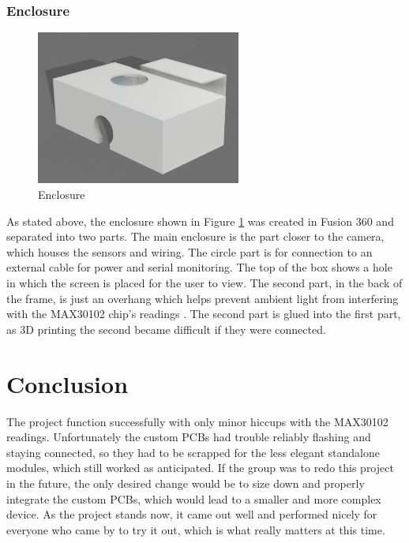 \documentclass[12pt]{article}
\begin{document}
\subsubsection{Enclosure}
    \begin{figure}[hbt!]
        \centering
        \includegraphics[width=0.6\textwidth]{images/enclosure_pic.png}
        \caption{Enclosure}
        \label{enc_ref}
    \end{figure}
    
    As stated above, the enclosure shown in Figure \ref{enc_ref} was created in Fusion 360 and separated into two parts. The main enclosure is the part closer to the camera, which houses the sensors and wiring. The circle part is for connection to an external cable for power and serial monitoring. The top of the box shows a hole in which the screen is placed for the user to view. The second part, in the back of the frame, is just an overhang which helps prevent ambient light from interfering with the MAX30102 chip's readings \cite{max30102}. The second part is glued into the first part, as 3D printing the second became difficult if they were connected.   

\section{Conclusion}
    The project function successfully with only minor hiccups with the MAX30102 readings. Unfortunately the custom PCBs had trouble reliably flashing and staying connected, so they had to be scrapped for the less elegant standalone modules, which still worked as anticipated. If the group was to redo this project in the future, the only desired change would be to size down and properly integrate the custom PCBs, which would lead to a smaller and more complex device. As the project stands now, it came out well and performed nicely for everyone who came by to try it out, which is what really matters at this time. 
\end{document}
